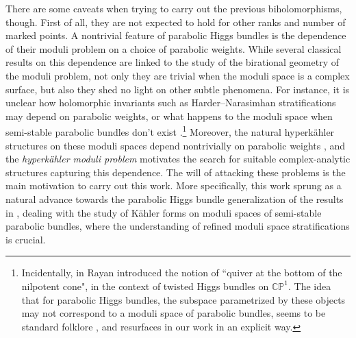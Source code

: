 \documentclass[pdftex]{sigma}
\newcommand{\field}[1]{\ensuremath{\mathbb{#1}}}
\newcommand{\CC}{\field{C}}
\newcommand{\PP}{\field{P}}
\numberwithin{equation}{section}
\begin{document}
There are some caveats when trying to carry out the previous biholomorphisms, though. First of all, they are not expected to hold for other ranks and number of marked points.
A nontrivial feature of parabolic Higgs bundles is the dependence of their moduli problem on a choice of parabolic weights.
While several classical results on this dependence \cite{Nak96, Thad02} are linked to the study of the birational geometry of the moduli problem, not only they are trivial when the moduli space is a complex surface, but also they shed no light on other subtle phenomena. For instance, it is unclear how holomorphic invariants such as Harder--Narasimhan stratifications may depend on parabolic weights, or what happens to the moduli space when semi-stable parabolic bundles don't exist \cite{Bau91, Bis98}.\footnote{Incidentally, in \cite{Ray17} Rayan introduced the notion of ``quiver at the bottom of the nilpotent cone", in the context of twisted Higgs bundles on $\CC\PP^{1}$. The idea that for parabolic Higgs bundles, the subspace parametrized by these objects may not correspond to a moduli space of parabolic bundles, seems to be standard folklore \cite{Bla15}, and resurfaces in our work in an explicit way.} Moreover, the natural hyperk\"ahler structures on these moduli spaces depend nontrivially on parabolic weights \cite{KW18, MT21}, and the \textit{hyperk\"ahler moduli problem} motivates the search for suitable complex-analytic structures capturing this dependence. The will of attacking these problems is the main motivation to carry out this work. More specifically, this work sprung as a natural advance towards the parabolic Higgs bundle generalization of the results in \cite{MT21}, dealing with the study of K\"ahler forms on moduli spaces of semi-stable parabolic bundles, where the understanding of refined moduli space stratifications is crucial.
\end{document}
